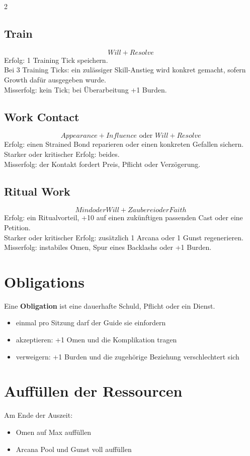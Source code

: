 \begin{multicols*}{2}
\subsection{Train}
\[
Will + Resolve
\]
Erfolg: 1 Training Tick speichern.\\
Bei 3 Training Ticks: ein zulässiger Skill-Anstieg wird konkret gemacht, sofern Growth dafür ausgegeben wurde.\\
Misserfolg: kein Tick; bei Überarbeitung +1 Burden.

\subsection{Work Contact}
\[
Appearance + Influence \text{ oder } Will + Resolve
\]
Erfolg: einen Strained Bond reparieren oder einen konkreten Gefallen sichern.\\
Starker oder kritischer Erfolg: beides.\\
Misserfolg: der Kontakt fordert Preis, Pflicht oder Verzögerung.

\subsection{Ritual Work}
\[
Mind oder Will + Zauberei oder Faith
\]
Erfolg: ein Ritualvorteil, +10 auf einen zukünftigen passenden Cast oder eine Petition.\\
Starker oder kritischer Erfolg: zusätzlich 1 Arcana oder 1 Gunst regenerieren.\\
Misserfolg: instabiles Omen, Spur eines Backlashs oder +1 Burden.

\section{Obligations}
Eine \textbf{Obligation} ist eine dauerhafte Schuld, Pflicht oder ein Dienst.
\begin{itemize}[leftmargin=*]
\item einmal pro Sitzung darf der Guide sie einfordern
\item akzeptieren: +1 Omen und die Komplikation tragen
\item verweigern: +1 Burden und die zugehörige Beziehung verschlechtert sich
\end{itemize}

\section{Auffüllen der Ressourcen}
Am Ende der Auszeit:
\begin{itemize}[leftmargin=*]
\item Omen auf Max auffüllen
\item Arcana Pool und Gunst voll auffüllen
\end{itemize}
\end{multicols*}
